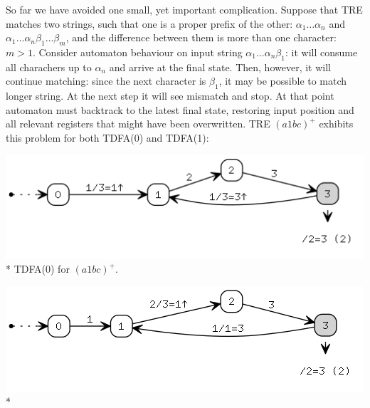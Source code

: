 \documentclass{article}
\theoremstyle{definition}
\begin{document}
\begin{multicols}{2}
So far we have avoided one small, yet important complication.
Suppose that TRE matches two strings, such that one is a proper prefix of the other:
$\alpha_1 \dots \alpha_n$ and $\alpha_1 \dots \alpha_n \beta_1 \dots \beta_m$,
and the difference between them is more than one character: $m \!>\! 1$.
Consider automaton behaviour on input string $\alpha_1 \dots \alpha_n \beta_1$:
it will consume all charachers up to $\alpha_n$ and arrive at the final state.
Then, however, it will continue matching: since the next character is $\beta_1$, it may be possible to match longer string.
At the next step it will see mismatch and stop.
At that point automaton must backtrack to the latest final state,
restoring input position and all relevant registers that might have been overwritten.
TRE $(a 1 bc)^+$ exhibits this problem for both TDFA(0) and TDFA(1):
\begin{center}
\includegraphics[width=\linewidth]{img/fallback/tdfa0.png}\\*
\small{TDFA(0) for $(a 1 bc)^+$.} \\
\end{center}
\begin{center}
\includegraphics[width=\linewidth]{img/fallback/tdfa1.png}\\*

\end{center}
\end{multicols}
\end{document}
